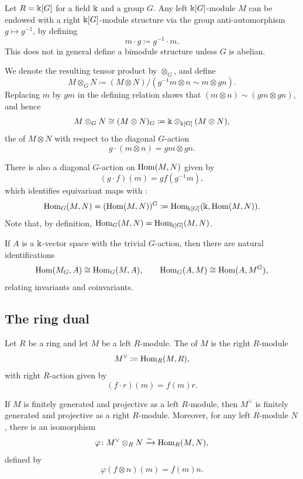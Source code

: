 \begin{example}
Let $R = \Bbbk[G]$ for a field $\Bbbk$ and a group $G$. Any left $\Bbbk[G]$-module $M$ can be endowed with a right $\Bbbk[G]$-module structure via the group anti-automorphism $g \mapsto g^{-1}$, by defining
\[
m \cdot g \coloneqq g^{-1} \cdot m.
\]
This does not in general define a bimodule structure unless $G$ is abelian.

We denote the resulting tensor product by $\otimes_G$, and define
\[
M \otimes_G N \coloneqq (M \otimes N) \big/ (g^{-1}m \otimes n \sim m \otimes gn).
\]
Replacing $m$ by $gm$ in the defining relation shows that $(m \otimes n) \sim (gm \otimes gn)$, and hence
\[
M \otimes_G N \cong (M \otimes N)_G \coloneqq \Bbbk \otimes_{\Bbbk[G]} (M \otimes N),
\]
the  of $M \otimes N$ with respect to the diagonal $G$-action
\[
g \cdot (m \otimes n) = gm \otimes gn.
\]

There is also a diagonal $G$-action on $\mathrm{Hom}(M,N)$ given by
\[
(g \cdot f)(m) = g f(g^{-1} m),
\]
which identifies equivariant maps with :
\[
\mathrm{Hom}_G(M,N) = (\mathrm{Hom}(M,N))^G \coloneqq \mathrm{Hom}_{\Bbbk[G]}(\Bbbk, \mathrm{Hom}(M,N)).
\]
Note that, by definition, $\mathrm{Hom}_G(M,N) = \mathrm{Hom}_{\Bbbk[G]}(M,N)$.

If $A$ is a $\Bbbk$-vector space with the trivial $G$-action, then there are natural identifications
\[
\mathrm{Hom}(M_G, A) \cong \mathrm{Hom}_G(M,A),
\qquad
\mathrm{Hom}_G(A,M) \cong \mathrm{Hom}(A, M^G),
\]
relating invariants and coinvariants.
\end{example}

\subsection{The ring dual}

Let $R$ be a ring and let $M$ be a left $R$-module. The  of $M$ is the right $R$-module
\[
M^\vee \coloneqq \mathrm{Hom}_R(M,R),
\]
with right $R$-action given by
\[
(f \cdot r)(m) = f(m) r.
\]

If $M$ is finitely generated and projective as a left $R$-module, then $M^\vee$ is finitely generated and projective as a right $R$-module. Moreover, for any left $R$-module $N$, there is an isomorphism
\[
\varphi \colon M^\vee \otimes_R N \xrightarrow{\sim} \mathrm{Hom}_R(M,N),
\]
defined by
\[
\varphi(f \otimes n)(m) = f(m) n.
\]

